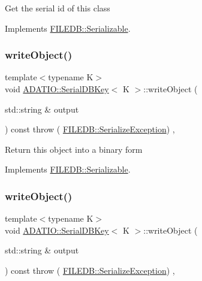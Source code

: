 Get the serial id of this class 

Implements \mbox{\hyperlink{classFILEDB_1_1Serializable_a5d639b5dbd5d8ebc7dca1eca31bbc868}{F\+I\+L\+E\+D\+B\+::\+Serializable}}.

\mbox{\label{classADATIO_1_1SerialDBKey_a6e2d9bbd18a3fa5e049f0ad5321d328a}} 
\subsubsection{\texorpdfstring{writeObject()}{writeObject()}\hspace{0.1cm}{\footnotesize\ttfamily [1/3]}}
{\footnotesize\ttfamily template$<$typename K$>$ \\
void \mbox{\hyperlink{classADATIO_1_1SerialDBKey}{A\+D\+A\+T\+I\+O\+::\+Serial\+D\+B\+Key}}$<$ K $>$\+::write\+Object (\begin{DoxyParamCaption}\item[{std\+::string \&}]{output }\end{DoxyParamCaption}) const throw ( \mbox{\hyperlink{classFILEDB_1_1SerializeException}{F\+I\+L\+E\+D\+B\+::\+Serialize\+Exception}}) \hspace{0.3cm}{\ttfamily [inline]}, {\ttfamily [virtual]}}

Return this object into a binary form 

Implements \mbox{\hyperlink{classFILEDB_1_1Serializable_a8deaa86e108c08c863881e46cf5578ea}{F\+I\+L\+E\+D\+B\+::\+Serializable}}.

\mbox{\label{classADATIO_1_1SerialDBKey_a6e2d9bbd18a3fa5e049f0ad5321d328a}} 
\subsubsection{\texorpdfstring{writeObject()}{writeObject()}\hspace{0.1cm}{\footnotesize\ttfamily [2/3]}}
{\footnotesize\ttfamily template$<$typename K$>$ \\
void \mbox{\hyperlink{classADATIO_1_1SerialDBKey}{A\+D\+A\+T\+I\+O\+::\+Serial\+D\+B\+Key}}$<$ K $>$\+::write\+Object (\begin{DoxyParamCaption}\item[{std\+::string \&}]{output }\end{DoxyParamCaption}) const throw ( \mbox{\hyperlink{classFILEDB_1_1SerializeException}{F\+I\+L\+E\+D\+B\+::\+Serialize\+Exception}}) \hspace{0.3cm}{\ttfamily [inline]}, {\ttfamily [virtual]}}

